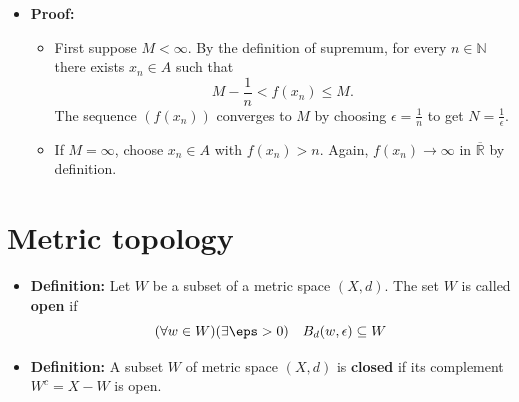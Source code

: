 \documentclass[11pt,twoside]{report}
\newcommand{\bbN}{{\mathbb{N}}}
\newcommand{\bbR}{{\mathbb{R}}}
\begin{document}
\begin{itemize}
\begin{itemize}
\item \textbf{Proof:}
\begin{itemize}
\item First suppose $M<\infty$.  By the definition of supremum, for every $n\in\bbN$ there exists $x_n \in A$ such that
\[
M-\frac{1}{n}<f(x_n)\leq M.
\]
The sequence $(f(x_n))$ converges to $M$ by choosing $\epsilon = \frac{1}{n}$ to get $N = \frac{1}{\epsilon}$.

\item If $M=\infty$, choose $x_n\in A$ with $f(x_n)>n$.
Again, $f(x_n) \to \infty$ in $\overline{\bbR}$ by definition.
\end{itemize}

\end{itemize}




\section{Metric topology} 

\begin{itemize}

\item \textbf{Definition:}  Let $W$ be a subset of a metric space $(X,d)$.
The set $W$ is called \textbf{open} if%
\[
(\forall w  \in W) ( \exists  \eps > 0) \quad B_d (w,\epsilon) \subseteq W
\]





\item \textbf{Definition:} A subset $W$ of metric space $(X,d)$ is \textbf{closed} if its complement $W^c = X-W$ is open.




\end{itemize}
\end{itemize}
\end{document}
